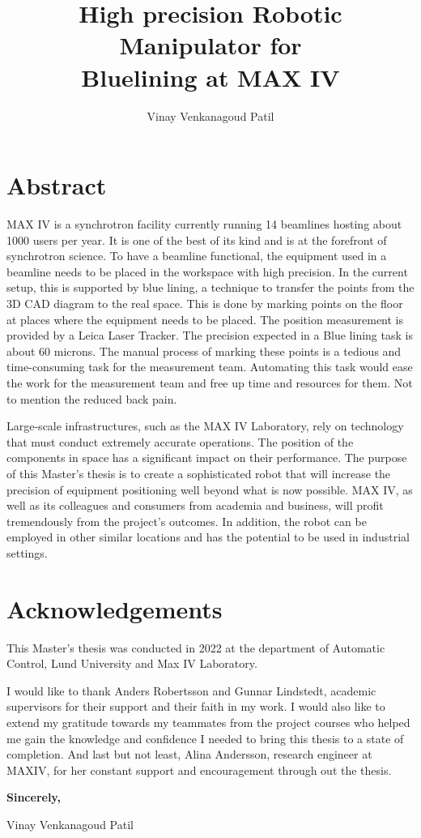 \documentclass{LTHthesis}
\begin{document}
\begin{titlepages}
\author{Vinay Venkanagoud Patil}
\title{High precision Robotic Manipulator for\\ Bluelining at MAX IV}
\end{titlepages}
\chapter*{Abstract}
MAX IV is a synchrotron facility currently running 14 beamlines hosting about 1000 users per year. It is one of the best of its kind and is at the forefront of synchrotron science. To have a beamline functional, the equipment used in a beamline needs to be placed in the workspace with high precision. In the current setup, this is supported by blue lining, a technique to transfer the points from the 3D CAD diagram to the real space. This is done by marking points on the floor at places where the equipment needs to be placed. The position measurement is provided by a Leica Laser Tracker. The precision expected in a Blue lining task is about 60 microns. The manual process of marking these points is a tedious and time-consuming task for the measurement team. Automating this task would ease the work for the measurement team and free up time and resources for them. Not to mention the reduced back pain.


Large-scale infrastructures, such as the MAX IV Laboratory, rely on technology that must conduct extremely accurate operations. The position of the components in space has a significant impact on their performance. The purpose of this Master's thesis is to create a sophisticated robot that will increase the precision of equipment positioning well beyond what is now possible. MAX IV, as well as its colleagues and consumers from academia and business, will profit tremendously from the project's outcomes. In addition, the robot can be employed in other similar locations and has the potential to be used in industrial settings.

\chapter*{Acknowledgements}
This Master's thesis was conducted in 2022 at the department of Automatic Control, Lund University and Max IV Laboratory. 

I would like to thank Anders Robertsson and Gunnar Lindstedt, academic supervisors for their support and their faith in my work. I would also like to extend my gratitude towards my teammates from the project courses who helped me gain the knowledge and confidence I needed to bring this thesis to a state of completion. And last but not least, Alina Andersson, research engineer at MAXIV, for her constant support and encouragement through out the thesis.
\begin{flushleft}
\textbf{Sincerely,}

Vinay Venkanagoud Patil

\end{flushleft}
\tableofcontents
\end{document}

